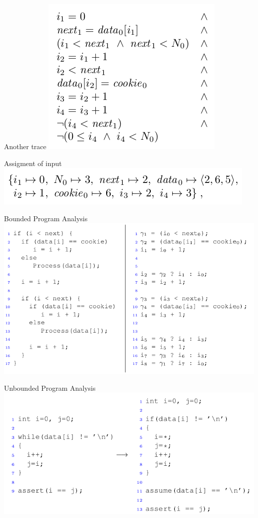 \documentclass{beamer}
\begin{document}
\begin{frame}{Another trace}
\includegraphics[scale=0.5]{path_constraint2.png}
\end{frame}

\begin{frame}{Assigment of input}
\includegraphics[scale=0.5]{eval.png}
\end{frame}

\begin{frame}{Bounded Program Analysis}
\includegraphics[scale=0.45]{bounded_program_analysis.png}
\end{frame}

\begin{frame}{Unbounded Program Analysis}
\includegraphics[scale=0.5]{unbounded_program_analysis.png}
\end{frame}
\end{document}
